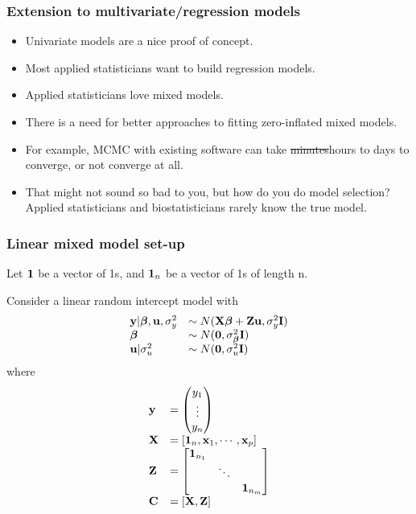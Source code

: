 \documentclass{beamer}
\begin{document}
\begin{frame}
\frametitle{Extension to multivariate/regression models}
\begin{itemize}
\item Univariate models are a nice proof of concept.
\item Most applied statisticians want to build regression models.
\item Applied statisticians love mixed models.
\item There is a need for better approaches to fitting zero-inflated mixed models.
\item For example, MCMC with existing software can take \sout{minutes}hours 
to days to converge, or not converge at all.
\item That might not sound so bad to you, but how do you
do model selection? Applied statisticians and biostatisticians rarely know the true model.
\end{itemize}
\end{frame}



\begin{frame}
\frametitle{Linear mixed model set-up}
Let ${\bf 1}$ be a vector of 1s, and ${\bf 1}_n$ be a vector of 1s of
length n.

Consider a linear random intercept model with
$$
\begin{array}{ll}
{\bf y}|{\boldsymbol \beta},{\bf u},\sigma_y^2 &\sim N({\bf X} {\boldsymbol \beta} + {\bf Z} {\bf u}, \sigma_y^2 {\bf I}) \\
{\boldsymbol \beta} &\sim N({\bf 0}, \sigma_{\boldsymbol \beta}^2 {\bf I}) \\
{\bf u}|\sigma_u^2 &\sim N({\bf 0}, \sigma_u^2 {\bf I})
\end{array}
$$
\noindent where
$$
\begin{array}{ll}
{\bf y} & =
\begin{pmatrix}
y_1 \\
\vdots \\
y_n
\end{pmatrix} \\
{\bf X} &= [{\bf 1}_n, {\bf x}_1, \cdots, {\bf x}_p] \\
{\bf Z} &=
\begin{bmatrix}
{\bf1}_{n_1} &  & \\
& \ddots & \\
& & {\bf 1}_{n_m}
\end{bmatrix} \\
{\bf C} &= [{\bf X}, {\bf Z}]
\end{array}
$$
\end{frame}
\end{document}
